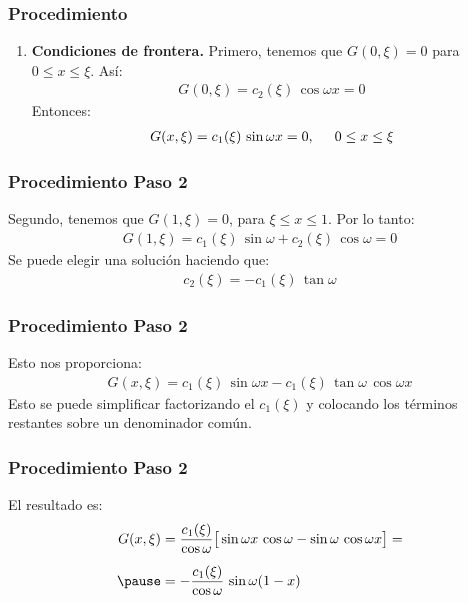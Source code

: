 \documentclass[12pt]{beamer}
\begin{document}
\begin{frame}
\frametitle{Procedimiento}
\begin{enumerate}[<+->]
\conti
\item \textbf{Condiciones de frontera.}
\pause
Primero, tenemos que $G (0, \xi) = 0$ para $0 \leq x \leq \xi$. Así:
\pause
\begin{align*}
G (0, \xi) = c_{2} (\xi) \, \cos \omega x = 0
\end{align*}
\pause
Entonces:
\pause
\begin{align*}
G (x, \xi) = c_{1} (\xi) \, \sin \omega x = 0, \hspace{0.5cm} 0 \leq x \leq \xi
\end{align*}
\seti
\end{enumerate}
\end{frame}
\begin{frame}
\frametitle{Procedimiento Paso 2}
Segundo, tenemos que $G (1, \xi) = 0$, para $\xi \leq x \leq 1$. Por lo tanto:
\pause
\begin{align*}
G (1, \xi) = c_{1} (\xi) \, \sin \omega + c_{2} (\xi) \, \cos \omega = 0
\end{align*}
\pause
Se puede elegir una solución haciendo que:
\pause
\begin{align*}
c_{2} (\xi) = - c_{1} (\xi) \, \tan \omega
\end{align*}
\end{frame}
\begin{frame}
\frametitle{Procedimiento Paso 2}
Esto nos proporciona:
\pause
\begin{align*}
G (x, \xi) = c_{1} (\xi) \, \sin \omega x - c_{1} (\xi) \, \tan \omega \, \cos \omega x
\end{align*}
\pause
Esto se puede simplificar factorizando el $c_{1} (\xi)$ y colocando los términos restantes sobre un denominador común.
\end{frame}
\begin{frame}
\frametitle{Procedimiento Paso 2}
El resultado es:
\pause
\begin{eqnarray}
\begin{aligned}[b]
G (x, \xi) &= \dfrac{c_{1} (\xi)}{\cos \omega} \big[ \sin \omega x \, \cos \omega - \sin \omega \, \cos \omega x \big] = \\[0.5em] \pause
&= - \dfrac{c_{1} (\xi)}{\cos \omega} \, \sin \omega (1 - x)
\end{aligned}
\label{eq:ecuaction_07_38}
\end{eqnarray}
\end{frame}
\end{document}
